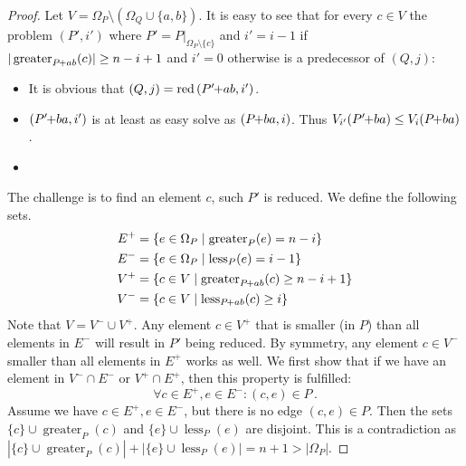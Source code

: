 \documentclass[twoside,leqno,twocolumn]{article}
\newcommand{\pchild}[3]{{#1}\kern-1pt{+}{#2}{#3}}
\newcommand{\reduced}[1]{\operatorname{red}{#1}}
\newcommand{\less}[2]{\operatorname{less}_{#1}(#2)}
\newcommand{\greater}[2]{\operatorname{greater}_{#1}(#2)}
\begin{document}
\begin{proof}
  Let $V = \Omega_P \setminus (\Omega_Q \cup \{a, b\})$.
  It is easy to see that for every $c \in V$ the problem $(P', i')$ where $P' = P|_{\Omega_P \setminus \{c\}}$ and $i' = i - 1$ if $|\greater{\pchild{P}{a}{b}}{c}| \ge n-i+1$ and $i'=0$ otherwise is a predecessor of $(Q, j)$:
  \begin{itemize}
    \item It is obvious that $(Q, j) = \reduced{(\pchild{P'}{a}{b}, i')}$.
    \item $(\pchild{P'}{b}{a}, i')$ is at least as easy solve as $(\pchild{P}{b}{a}, i)$. Thus $V_{i'}(\pchild{P'}{b}{a}) \le V_i(\pchild{P}{b}{a})$.
    \item {}
  \end{itemize}
  The challenge is to find an element $c$, such $P'$ is reduced.
  We define the following sets.
  \begin{align*}
    E^+ &= \{e \in \Omega_P \mid \greater{P}{e} = n - i \}\\
    E^- &= \{e \in \Omega_P \mid \less{P}{e} = i - 1 \}\\
    V^+ &= \{c \in V \mid \greater{\pchild{P}{a}{b}}{c} \ge n - i + 1 \}\\
    V^- &= \{c \in V \mid \less{\pchild{P}{a}{b}}{c} \ge i \}
  \end{align*}
  Note that $V = V^- \cup V^+$.
  Any element $c \in V^+$ that is smaller (in $P$) than all elements in $E^-$ will result in $P'$ being reduced.
  By symmetry, any element $c \in V^-$ smaller than all elements in $E^+$ works as well.
  We first show that if we have an element in $V^- \cap E^-$ or $V^+ \cap E^+$, then this property is fulfilled:
  \begin{equation}
    \forall c \in E^+, e \in E^- \colon (c, e) \in P\,\text{.}
  \end{equation}
  Assume we have $c \in E^+, e \in E^-$, but there is no edge $(c, e) \in P$. Then the sets $\{c\} \cup \greater{P}{c}$ and $\{e\} \cup \less{P}{e}$ are disjoint.
  This is a contradiction as $|\{c\} \cup \greater{P}{c}| + |\{e\} \cup \less{P}{e}| = n + 1 > |\Omega_P|$.
  

\end{proof}
\end{document}
